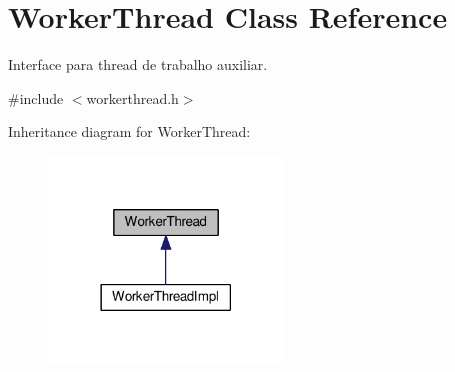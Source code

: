 \hypertarget{classWorkerThread}{}\section{Worker\+Thread Class Reference}
\label{classWorkerThread}


Interface para thread de trabalho auxiliar.  




{\ttfamily \#include $<$workerthread.\+h$>$}



Inheritance diagram for Worker\+Thread\+:\nopagebreak
\begin{figure}[H]
\begin{center}
\leavevmode
\includegraphics[width=177pt]{d3/da8/classWorkerThread__inherit__graph}
\end{center}
\end{figure}
